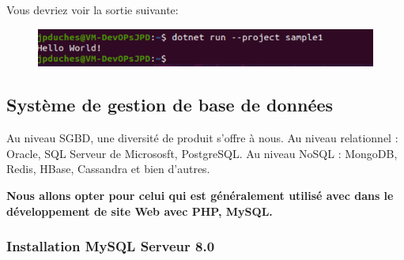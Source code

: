 	Vous devriez voir la sortie suivante:
	
	\begin{figure}[!htb]
		\centering
		\includegraphics[scale=0.8]{images/capture4}
		
	\end{figure}
	
	
	\subsection{Système de gestion de base de données}
	Au niveau SGBD, une diversité de produit s'offre à nous. Au niveau relationnel :  Oracle, SQL Serveur de  Micrososft, PostgreSQL. Au niveau NoSQL : MongoDB, Redis, HBase, Cassandra et bien d'autres.
	
	
	\textbf{Nous allons opter pour celui qui est généralement utilisé avec dans le développement de site Web avec PHP, MySQL.}
	
	\subsubsection{Installation MySQL Serveur 8.0}
	
